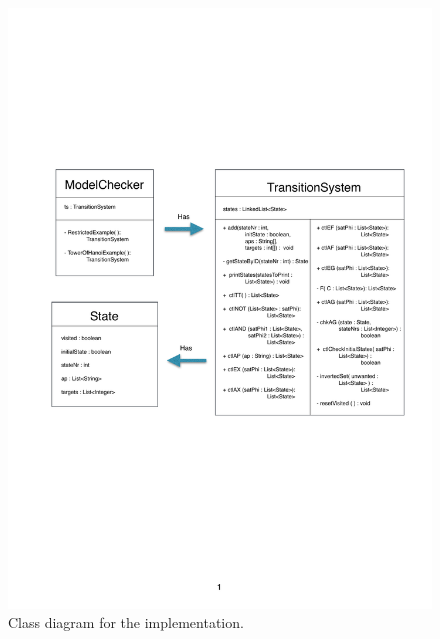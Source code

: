 \begin{figure}[H]
    \centering
    \includegraphics[width=\textwidth]{fig/classdiagram.pdf}
    \caption{Class diagram for the implementation.}
    \label{fig:classdiagram}
\end{figure}
